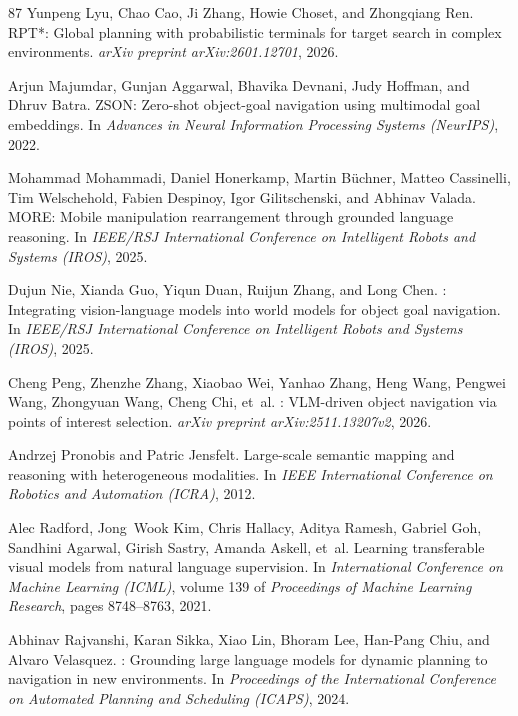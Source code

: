 \documentclass[10pt]{article}
\begin{document}
\begin{thebibliography}{87}
Yunpeng Lyu, Chao Cao, Ji Zhang, Howie Choset, and Zhongqiang Ren.
\newblock RPT*: Global planning with probabilistic terminals for target search in complex environments.
\newblock \emph{arXiv preprint arXiv:2601.12701}, 2026.

Arjun Majumdar, Gunjan Aggarwal, Bhavika Devnani, Judy Hoffman, and Dhruv Batra.
\newblock ZSON: Zero-shot object-goal navigation using multimodal goal embeddings.
\newblock In \emph{Advances in Neural Information Processing Systems (NeurIPS)}, 2022.

Mohammad Mohammadi, Daniel Honerkamp, Martin B{\"u}chner, Matteo Cassinelli, Tim Welschehold, Fabien Despinoy, Igor Gilitschenski, and Abhinav Valada.
\newblock MORE: Mobile manipulation rearrangement through grounded language reasoning.
\newblock In \emph{IEEE/RSJ International Conference on Intelligent Robots and Systems (IROS)}, 2025.

Dujun Nie, Xianda Guo, Yiqun Duan, Ruijun Zhang, and Long Chen.
: Integrating vision-language models into world models for object goal navigation.
\newblock In \emph{IEEE/RSJ International Conference on Intelligent Robots and Systems (IROS)}, 2025.

Cheng Peng, Zhenzhe Zhang, Xiaobao Wei, Yanhao Zhang, Heng Wang, Pengwei Wang, Zhongyuan Wang, Cheng Chi, et~al.
: {VLM}-driven object navigation via points of interest selection.
\newblock \emph{arXiv preprint arXiv:2511.13207v2}, 2026.

Andrzej Pronobis and Patric Jensfelt.
\newblock Large-scale semantic mapping and reasoning with heterogeneous modalities.
\newblock In \emph{IEEE International Conference on Robotics and Automation (ICRA)}, 2012.

Alec Radford, Jong~Wook Kim, Chris Hallacy, Aditya Ramesh, Gabriel Goh, Sandhini Agarwal, Girish Sastry, Amanda Askell, et~al.
\newblock Learning transferable visual models from natural language supervision.
\newblock In \emph{International Conference on Machine Learning (ICML)}, volume 139 of \emph{Proceedings of Machine Learning Research}, pages 8748--8763, 2021.

Abhinav Rajvanshi, Karan Sikka, Xiao Lin, Bhoram Lee, Han-Pang Chiu, and Alvaro Velasquez.
: Grounding large language models for dynamic planning to navigation in new environments.
\newblock In \emph{Proceedings of the International Conference on Automated Planning and Scheduling (ICAPS)}, 2024.


\end{thebibliography}
\end{document}
